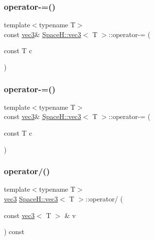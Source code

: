 \subsubsection{\texorpdfstring{operator-\/=()}{operator-=()}\hspace{0.1cm}{\footnotesize\ttfamily [6/7]}}
{\footnotesize\ttfamily template$<$typename T$>$ \\
const \mbox{\hyperlink{struct_space_h_1_1vec3}{vec3}}\& \mbox{\hyperlink{struct_space_h_1_1vec3}{Space\+H\+::vec3}}$<$ T $>$\+::operator-\/= (\begin{DoxyParamCaption}\item[{const T}]{c }\end{DoxyParamCaption})\hspace{0.3cm}{\ttfamily [inline]}}

\mbox{\label{struct_space_h_1_1vec3_a78f7adf1ccf20819b5c9a536762933e0}} 
\subsubsection{\texorpdfstring{operator-\/=()}{operator-=()}\hspace{0.1cm}{\footnotesize\ttfamily [7/7]}}
{\footnotesize\ttfamily template$<$typename T$>$ \\
const \mbox{\hyperlink{struct_space_h_1_1vec3}{vec3}}\& \mbox{\hyperlink{struct_space_h_1_1vec3}{Space\+H\+::vec3}}$<$ T $>$\+::operator-\/= (\begin{DoxyParamCaption}\item[{const T}]{c }\end{DoxyParamCaption})\hspace{0.3cm}{\ttfamily [inline]}}

\mbox{\label{struct_space_h_1_1vec3_ab9d46a10bb578ff6939ed9280cb12df8}} 
\subsubsection{\texorpdfstring{operator/()}{operator/()}\hspace{0.1cm}{\footnotesize\ttfamily [1/7]}}
{\footnotesize\ttfamily template$<$typename T$>$ \\
\mbox{\hyperlink{struct_space_h_1_1vec3}{vec3}} \mbox{\hyperlink{struct_space_h_1_1vec3}{Space\+H\+::vec3}}$<$ T $>$\+::operator/ (\begin{DoxyParamCaption}\item[{const \mbox{\hyperlink{struct_space_h_1_1vec3}{vec3}}$<$ T $>$ \&}]{v }\end{DoxyParamCaption}) const\hspace{0.3cm}{\ttfamily [inline]}}



